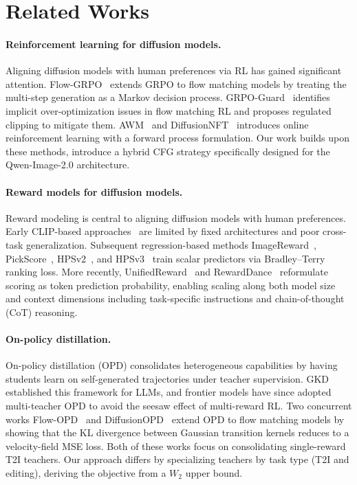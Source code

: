 \documentclass{llmxive}
\begin{document}
\section{Related Works}

\paragraph{Reinforcement learning for diffusion models.}
Aligning diffusion models with human preferences via RL has gained significant attention. Flow-GRPO~\citep{liu2025flowgrpo} extends GRPO to flow matching models by treating the multi-step generation as a Markov decision process. GRPO-Guard~\citep{wang2025grpo} identifies implicit over-optimization issues in flow matching RL and proposes regulated clipping to mitigate them. AWM~\citep{xue2025advantage} and DiffusionNFT~\citep{zheng2025diffusionnft} introduces online reinforcement learning with a forward process formulation. Our work builds upon these methods, introduce a hybrid CFG strategy specifically designed for the Qwen-Image-2.0 architecture.

\paragraph{Reward models for diffusion models.}
Reward modeling is central to aligning diffusion models with human preferences. Early CLIP-based approaches~\citep{clip} are limited by fixed architectures and poor cross-task generalization. Subsequent regression-based methods ImageReward~\citep{xu2023imagereward}, PickScore~\citep{kirstain2023pick}, HPSv2~\citep{wu2023human}, and HPSv3~\citep{ma2025hpsv3} train scalar predictors via Bradley--Terry ranking loss. More recently, UnifiedReward~\citep{wang2025unified,wang2026unified} and RewardDance~\citep{wu2025rewarddance} reformulate scoring as token prediction probability, enabling scaling along both model size and context dimensions including task-specific instructions and chain-of-thought (CoT) reasoning. 

\paragraph{On-policy distillation.}
On-policy distillation (OPD) consolidates heterogeneous capabilities by having students learn on self-generated trajectories under teacher supervision. GKD~\citep{agarwal2024policy} established this framework for LLMs, and frontier models have since adopted multi-teacher OPD to avoid the seesaw effect of multi-reward RL. Two concurrent works Flow-OPD~\citep{fang2026flow} and DiffusionOPD~\citep{li2026diffusionopd} extend OPD to flow matching models by showing that the KL divergence between Gaussian transition kernels reduces to a velocity-field MSE loss. Both of these works focus on consolidating single-reward T2I teachers. Our approach differs by specializing teachers by task type (T2I and editing), deriving the objective from a $W_2$ upper bound.
\end{document}
